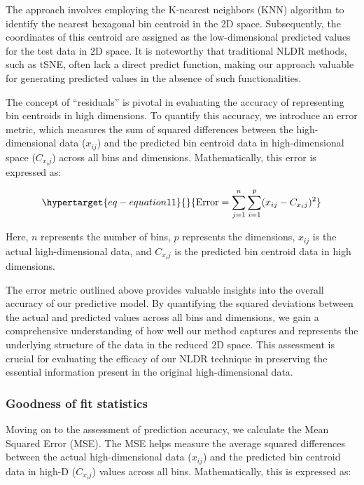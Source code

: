 \documentclass[
  12pt]{article}
\begin{document}
The approach involves employing the K-nearest neighbors (KNN) algorithm
to identify the nearest hexagonal bin centroid in the 2D space.
Subsequently, the coordinates of this centroid are assigned as the
low-dimensional predicted values for the test data in 2D space. It is
noteworthy that traditional NLDR methods, such as tSNE, often lack a
direct predict function, making our approach valuable for generating
predicted values in the absence of such functionalities.

The concept of ``residuals'' is pivotal in evaluating the accuracy of
representing bin centroids in high dimensions. To quantify this
accuracy, we introduce an error metric, which measures the sum of
squared differences between the high-dimensional data (\(x_{ij}\)) and
the predicted bin centroid data in high-dimensional space (\(C_{x_ij}\))
across all bins and dimensions. Mathematically, this error is expressed
as:

\begin{equation}\protect\hypertarget{eq-equation11}{}{
\text{Error} = \sum_{j = 1}^{n}\sum_{i = 1}^{p} (x_{ij} - C_{x_ij})^2
}\label{eq-equation11}\end{equation}

Here, \(n\) represents the number of bins, \(p\) represents the
dimensions, \(x_{ij}\) is the actual high-dimensional data, and
\(C_{x_ij}\) is the predicted bin centroid data in high dimensions.

The error metric outlined above provides valuable insights into the
overall accuracy of our predictive model. By quantifying the squared
deviations between the actual and predicted values across all bins and
dimensions, we gain a comprehensive understanding of how well our method
captures and represents the underlying structure of the data in the
reduced 2D space. This assessment is crucial for evaluating the efficacy
of our NLDR technique in preserving the essential information present in
the original high-dimensional data.

\hypertarget{sec-goodfit}{%
\subsubsection{Goodness of fit statistics}\label{sec-goodfit}}

Moving on to the assessment of prediction accuracy, we calculate the
Mean Squared Error (MSE). The MSE helps measure the average squared
differences between the actual high-dimensional data (\(x_{ij}\)) and
the predicted bin centroid data in high-D (\(C_{x_ij}\)) values across
all bins. Mathematically, this is expressed as:
\end{document}
